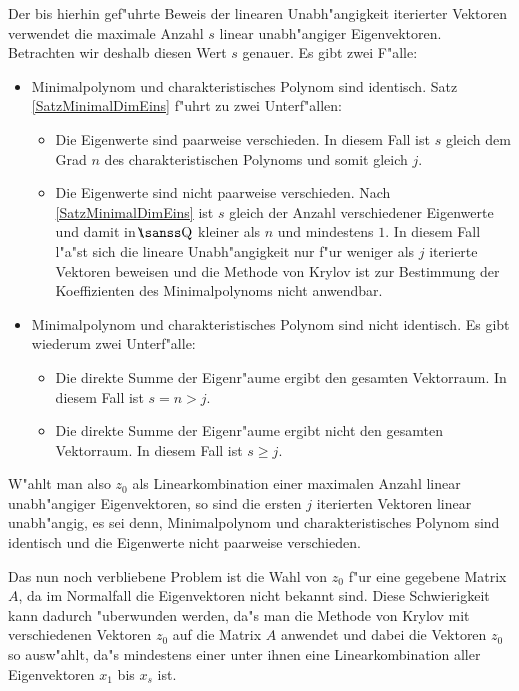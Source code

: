 Der bis hierhin gef"uhrte Beweis der linearen Unabh"angigkeit
iterierter Vektoren verwendet die maximale Anzahl $s$ linear unabh"angiger
Eigenvektoren. Betrachten wir deshalb diesen Wert $s$ genauer.
Es gibt zwei F"alle:
\begin{itemize}
\item
      Minimalpolynom und charakteristisches Polynom sind identisch.
      Satz \ref{SatzMinimalDimEins} f"uhrt zu zwei Unterf"allen:
      \begin{itemize}
      \item
            Die Eigenwerte sind paarweise verschieden. In diesem Fall
            ist $s$ gleich dem Grad $n$ des charakteristischen Polynoms
            und somit gleich $j$.
      \item
            Die Eigenwerte sind nicht paarweise verschieden. Nach
            \ref{SatzMinimalDimEins} ist $s$ gleich der Anzahl verschiedener
            Eigenwerte und damit in $\Rationals$ kleiner als $n$ und 
            mindestens $1$. In diesem Fall l"a"st sich die lineare
            Unabh"angigkeit nur f"ur weniger als $j$ iterierte Vektoren
            beweisen und die Methode von Krylov ist zur Bestimmung der
            Koeffizienten des Minimalpolynoms nicht anwendbar.
      \end{itemize}
\item 
      Minimalpolynom und charakteristisches Polynom sind nicht identisch.
      Es gibt wiederum zwei Unterf"alle:
      \begin{itemize}
      \item 
            Die direkte Summe der Eigenr"aume ergibt den gesamten 
            Vektorraum. In diesem Fall ist $s = n >j$.
      \item
            Die direkte Summe der Eigenr"aume ergibt nicht den gesamten
            Vektorraum. In diesem Fall ist $s \geq j$.
      \end{itemize}
\end{itemize}
W"ahlt man also $z_0$ als Linearkombination einer maximalen Anzahl linear
unabh"angiger Eigenvektoren, so sind die ersten $j$ iterierten Vektoren
linear unabh"angig, es sei denn, Minimalpolynom und charakteristisches
Polynom sind identisch und die Eigenwerte nicht paarweise verschieden.

Das nun noch verbliebene Problem ist die Wahl von $z_0$ f"ur eine gegebene 
Matrix $A$, da im Normalfall die Eigenvektoren nicht bekannt sind. Diese
Schwierigkeit
kann dadurch "uberwunden werden, da"s man die Methode von Krylov mit 
verschiedenen Vektoren $z_0$ auf die Matrix $A$ anwendet und dabei die
Vektoren $z_0$ so ausw"ahlt, da"s mindestens einer unter ihnen eine 
Linearkombination aller Eigenvektoren $x_1$ bis $x_s$ ist.

